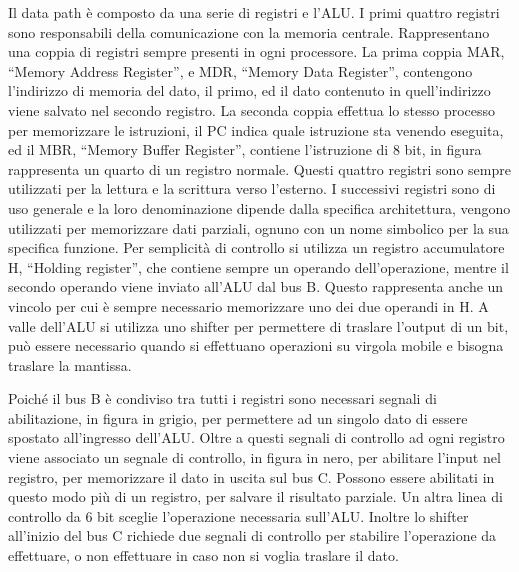 \documentclass{article}
\numberwithin{equation}{subsection}
\begin{document}
Il data path è composto da una serie di registri e l'ALU. I primi quattro registri sono responsabili della comunicazione con la memoria centrale. Rappresentano una coppia di registri 
sempre presenti in ogni processore. La prima coppia MAR, ``Memory Address Register'', e MDR, ``Memory Data Register'', contengono l'indirizzo di memoria del dato, il primo, ed il dato 
contenuto in quell'indirizzo viene salvato nel secondo registro. La seconda coppia effettua lo stesso processo per memorizzare le istruzioni, il PC indica quale istruzione sta venendo 
eseguita, ed il MBR, ``Memory Buffer Register'', contiene l'istruzione di 8 bit, in figura rappresenta un quarto di un registro normale. Questi 
quattro registri sono sempre utilizzati per la lettura e la scrittura verso l'esterno. 
I successivi registri sono di uso generale e la loro denominazione dipende dalla specifica architettura, vengono utilizzati per memorizzare dati parziali, ognuno con un nome 
simbolico per la sua specifica funzione. Per semplicità di controllo si utilizza un registro accumulatore H, ``Holding register'', che contiene sempre un operando dell'operazione, mentre il secondo 
operando viene inviato all'ALU dal bus B. Questo rappresenta anche un vincolo per cui è sempre necessario memorizzare uno dei due operandi in H. 
A valle dell'ALU si utilizza uno shifter per permettere di traslare l'output di un bit, può essere necessario quando si effettuano operazioni su virgola mobile e bisogna traslare la mantissa. 

Poiché il bus B è condiviso tra tutti i registri sono necessari segnali di abilitazione, in figura in grigio, per permettere ad un singolo dato di essere spostato all'ingresso dell'ALU. 
Oltre a questi segnali di controllo ad ogni registro viene associato un segnale di controllo, in figura in nero, per abilitare l'input nel registro, per memorizzare il dato in uscita sul 
bus C. Possono essere abilitati in questo modo più di un registro, per salvare il risultato parziale. Un altra linea di controllo da 6 bit sceglie l'operazione necessaria sull'ALU. 
Inoltre lo shifter all'inizio del bus C richiede due segnali di controllo per stabilire l'operazione da effettuare, o non effettuare in caso non si voglia traslare il dato. 
\end{document}
